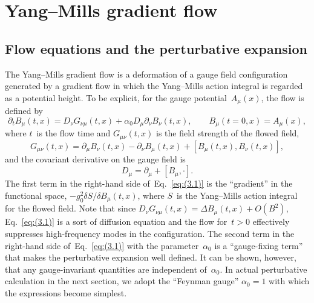 \section{Yang--Mills gradient flow}
\label{sec:3}
\subsection{Flow equations and the perturbative expansion}
The Yang--Mills gradient flow is a deformation of a gauge field configuration
generated by a gradient flow in which the Yang--Mills action integral is
regarded as a potential height. To be explicit, for the gauge
potential~$A_\mu(x)$, the flow is defined
by~\cite{Luscher:2010iy,Luscher:2011bx}
\begin{equation}
   \partial_tB_\mu(t,x)=D_\nu G_{\nu\mu}(t,x)
   +\alpha_0D_\mu\partial_\nu B_\nu(t,x),\qquad
   B_\mu(t=0,x)=A_\mu(x),
\label{eq:(3.1)}
\end{equation}
where $t$~is the flow time and $G_{\mu\nu}(t,x)$ is the field strength of the
flowed field,
\begin{equation}
   G_{\mu\nu}(t,x)
   =\partial_\mu B_\nu(t,x)-\partial_\nu B_\mu(t,x)
   +[B_\mu(t,x),B_\nu(t,x)],
\label{eq:(3.2)}
\end{equation}
and the covariant derivative on the gauge field is
\begin{equation}
   D_\mu=\partial_\mu+[B_\mu,\cdot].
\label{eq:(3.3)}
\end{equation}
The first term in the right-hand side of~Eq.~\eqref{eq:(3.1)} is the
``gradient'' in the functional space, $-g_0^2\delta S/\delta B_\mu(t,x)$, where
$S$~is the Yang--Mills action integral for the flowed field. Note that since
$D_\nu G_{\nu\mu}(t,x)=\Delta B_\mu(t,x)+O(B^2)$, Eq.~\eqref{eq:(3.1)} is a sort
of diffusion equation and the flow for~$t>0$ effectively suppresses
high-frequency modes in the configuration. The second term in the right-hand
side of~Eq.~\eqref{eq:(3.1)} with the parameter~$\alpha_0$ is a ``gauge-fixing
term'' that makes the perturbative expansion well defined. It can be shown,
however, that any gauge-invariant quantities are independent of~$\alpha_0$. In
actual perturbative calculation in the next section, we adopt the ``Feynman
gauge'' $\alpha_0=1$ with which the expressions become simplest.

